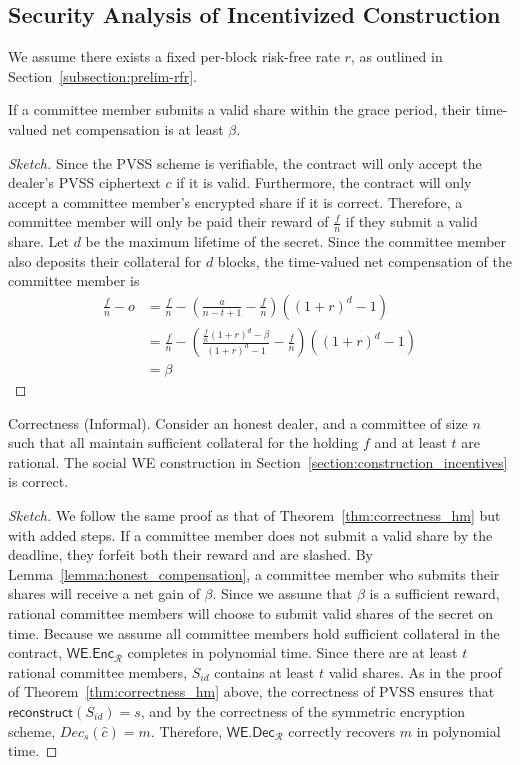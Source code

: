 \subsection{Security Analysis of Incentivized Construction}
We assume there exists a fixed per-block risk-free rate $r$, as outlined in Section~\ref{subsection:prelim-rfr}.
\begin{lemma}\label{lemma:honest_compensation}
    If a committee member submits a valid share within the grace period, their time-valued net compensation is at least $\beta$.
\end{lemma}
\begin{proof}[Sketch]
    Since the PVSS scheme is verifiable, the contract will only accept the dealer's PVSS ciphertext $c$ if it is valid.
    Furthermore, the contract will only accept a committee member's encrypted share if it is correct.
    Therefore, a committee member will only be paid their reward of $\frac{f}{n}$ if they submit a valid share.
    Let $d$ be the maximum lifetime of the secret.
    Since the committee member also deposits their collateral for $d$ blocks, the time-valued net compensation of the committee member is
    \begin{align*}
        \frac{f}{n} - o &= \frac{f}{n} - (\frac{a}{n - t + 1} - \frac{f}{n})((1 + r)^d - 1) \\
        &= \frac{f}{n} - (\frac{\frac{f}{n}(1 + r)^d - \beta}{(1 + r)^d - 1} - \frac{f}{n})((1 + r)^d - 1) \\
        &= \beta
    \end{align*}
\end{proof}
\begin{theorem}{Correctness (Informal).}
    Consider an honest dealer, and a committee of size $n$ such that all maintain sufficient collateral for the holding $f$ and at least $t$ are rational.
    The social WE construction in Section~\ref{section:construction_incentives} is correct.
\end{theorem}
\begin{proof}[Sketch]
    We follow the same proof as that of Theorem~\ref{thm:correctness_hm} but with added steps.
    If a committee member does not submit a valid share by the deadline, they forfeit both their reward and are slashed.
    By Lemma~\ref{lemma:honest_compensation}, a committee member who submits their shares will receive a net gain of $\beta$.
    Since we assume that $\beta$ is a sufficient reward, rational committee members will choose to submit valid shares of the secret on time.
    Because we assume all committee members hold sufficient collateral in the contract, $\textsf{WE.Enc}_\mathcal{R}$ completes in polynomial time.
    Since there are at least $t$ rational committee members, $S_{id}$ contains at least $t$ valid shares.
    As in the proof of Theorem~\ref{thm:correctness_hm} above, the correctness of PVSS ensures that $\textsf{reconstruct}(S_{id}) = s$, and by the correctness of the symmetric encryption scheme, $Dec_s(\hat{c}) = m$.
    Therefore, $\textsf{WE.Dec}_\mathcal{R}$ correctly recovers $m$ in polynomial time.
\end{proof}
